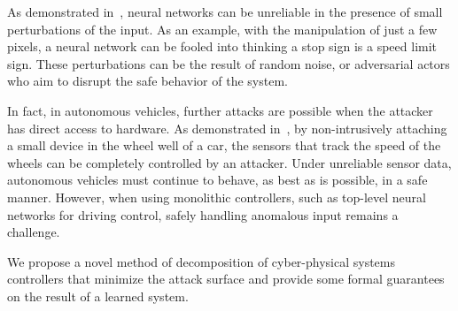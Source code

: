 As demonstrated in~\cite{DBLP:journals/corr/SzegedyZSBEGF13}, neural networks can be unreliable in the presence of small perturbations of the input.
As an example, with the manipulation of just a few pixels, a neural network can be fooled into thinking a stop sign is a speed limit sign.
These perturbations can be the result of random noise, or adversarial actors who aim to disrupt the safe behavior of the system.

In fact, in autonomous vehicles, further attacks are possible when the attacker has direct access to hardware.
As demonstrated in~\cite{DBLP:journals/iacr/Shoukry0TS15}, by non-intrusively attaching a small device in the wheel well of a car, the sensors that track the speed of the wheels can be completely controlled by an attacker.
Under unreliable sensor data, autonomous vehicles must continue to behave, as best as is possible, in a safe manner.
However, when using monolithic controllers, such as top-level neural networks for driving control, safely handling anomalous input remains a challenge.

We propose a novel method of decomposition of cyber-physical systems controllers that minimize the attack surface and provide some formal guarantees on the result of a learned system.
